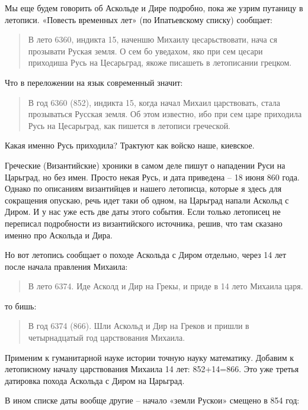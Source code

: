 Мы еще будем говорить об Аскольде и Дире подробно, пока же узрим путаницу в летописи. «Повесть временных лет» (по Ипатьевскому списку) сообщает:

\begin{quotation}  
В лето 6360, индикта 15, наченшю Михаилу цесарьствовати, нача ся прозывати Руская земля. О сем бо уведахом, яко при сем цесари приходиша Русь на Цесарьград, якоже писашеть в летописании грецком.
\end{quotation}  

Что в переложении на язык современный значит:

\begin{quotation}  
В год 6360 (852), индикта 15, когда начал Михаил царствовать, стала прозываться Русская земля. Об этом известно, ибо при сем царе приходила Русь на Цесарьград, как пишется в летописи греческой.
\end{quotation}  

Какая именно Русь приходила? Трактуют как войско наше, киевское. 

Греческие (Византийские) хроники в самом деле пишут о нападении Руси на Царьград, но без имен. Просто некая Русь, и дата приведена – 18 июня 860 года. Однако по описаниям византийцев и нашего летописца, которые я здесь для сокращения опускаю, речь идет таки об одном, на Царьград напали Аскольд с Диром. И у нас уже есть две даты этого события. Если только летописец не переписал подробности из византийского источника, решив, что там сказано именно про Аскольда и Дира.

Но вот летопись сообщает о походе Аскольда с Диром отдельно, через 14 лет после начала правления Михаила:

\begin{quotation}  
В лето 6374. Иде Асколд и Дир на Грекы, и приде в 14 лето Михаила царя.
\end{quotation}  

то бишь:

\begin{quotation}  
В год 6374 (866). Шли Аскольд и Дир на Греков и пришли в четырнадцатый год царствования Михаила.
\end{quotation} 

Применим к гуманитарной науке истории точную науку математику. Добавим к летописному началу царствования Михаила 14 лет: 852+14=866. Это уже третья датировка похода Аскольда с Диром на Царьград.

В ином списке даты вообще другие – начало «земли Рускои» смещено в 854 год:

